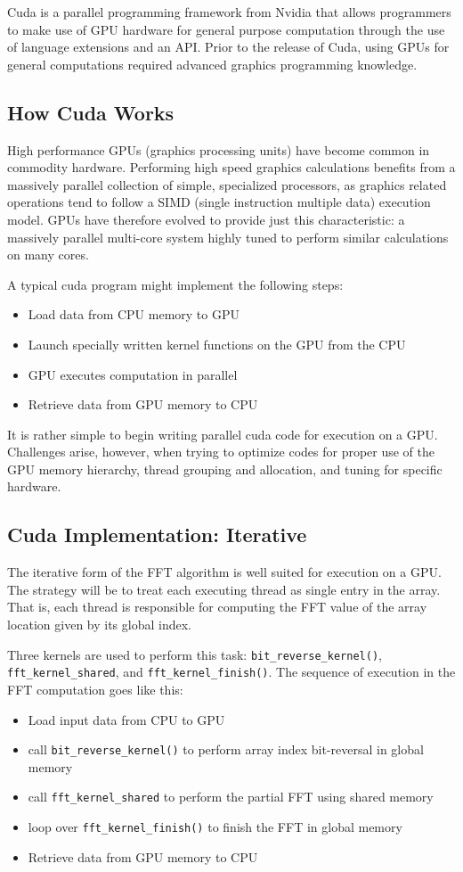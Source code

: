 Cuda is a parallel programming framework from Nvidia that allows programmers to make use of GPU hardware for general purpose computation through the use of language extensions and an API. Prior to the release of Cuda, using GPUs for general computations required advanced graphics programming knowledge. 
\subsection{How Cuda Works}
High performance GPUs (graphics processing units) have become common in commodity hardware. Performing high speed graphics calculations benefits from a massively parallel collection of simple, specialized processors, as graphics related operations tend to follow a SIMD (single instruction multiple data) execution model. GPUs have therefore evolved to provide just this characteristic: a massively parallel multi-core system highly tuned to perform similar calculations on many cores.

A typical cuda program might implement the following steps:
\begin{itemize}
    \item Load data from CPU memory to GPU
    \item Launch specially written kernel functions on the GPU from the CPU
    \item GPU executes computation in parallel
    \item Retrieve data from GPU memory to CPU
\end{itemize}

It is rather simple to begin writing parallel cuda code for execution on a GPU. Challenges arise, however, when trying to optimize codes for proper use of the GPU memory hierarchy, thread grouping and allocation, and tuning for specific hardware. 

\subsection{Cuda Implementation: Iterative}
The iterative form of the FFT algorithm is well suited for execution on a GPU. The strategy will be to treat each executing thread as single entry in the array. That is, each thread is responsible for computing the FFT value of the array location given by its global index. 

Three kernels are used to perform this task: \texttt{bit\_reverse\_kernel()}, \texttt{fft\_kernel\_shared}, and \texttt{fft\_kernel\_finish()}. The sequence of execution in the FFT computation goes like this:
\begin{itemize}
    \item Load input data from CPU to GPU
    \item call \texttt{bit\_reverse\_kernel()} to perform array index bit-reversal in global memory
    \item call \texttt{fft\_kernel\_shared} to perform the partial FFT using shared memory
    \item loop over \texttt{fft\_kernel\_finish()} to finish the FFT in global memory
    \item Retrieve data from GPU memory to CPU
\end{itemize}

